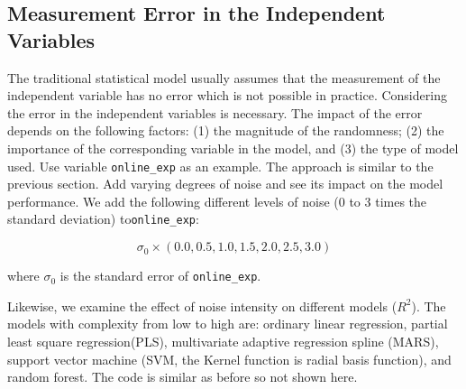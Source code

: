 \documentclass[12pt,]{krantz}
\newenvironment{Shaded}{\begin{snugshade}}{\end{snugshade}}
\newcommand{\KeywordTok}[1]{\textcolor[rgb]{0.13,0.29,0.53}{\textbf{{#1}}}}
\newcommand{\DataTypeTok}[1]{\textcolor[rgb]{0.13,0.29,0.53}{{#1}}}
\newcommand{\DecValTok}[1]{\textcolor[rgb]{0.00,0.00,0.81}{{#1}}}
\newcommand{\FloatTok}[1]{\textcolor[rgb]{0.00,0.00,0.81}{{#1}}}
\newcommand{\OtherTok}[1]{\textcolor[rgb]{0.56,0.35,0.01}{{#1}}}
\newcommand{\NormalTok}[1]{{#1}}
\theoremstyle{definition}
\theoremstyle{definition}
\theoremstyle{remark}
\begin{document}
\subsection{Measurement Error in the Independent
Variables}\label{measurement-error-in-the-independent-variables}

The traditional statistical model usually assumes that the measurement
of the independent variable has no error which is not possible in
practice. Considering the error in the independent variables is
necessary. The impact of the error depends on the following factors: (1)
the magnitude of the randomness; (2) the importance of the corresponding
variable in the model, and (3) the type of model used. Use variable
\texttt{online\_exp} as an example. The approach is similar to the
previous section. Add varying degrees of noise and see its impact on the
model performance. We add the following different levels of noise (0 to
3 times the standard deviation) to\texttt{online\_exp}:

\[\sigma_{0} \times (0.0, 0.5, 1.0, 1.5, 2.0, 2.5, 3.0)\]

where \(\sigma_{0}\) is the standard error of \texttt{online\_exp}.

\begin{Shaded}
\end{Shaded}

Likewise, we examine the effect of noise intensity on different models
(\(R^2\)). The models with complexity from low to high are: ordinary
linear regression, partial least square regression(PLS), multivariate
adaptive regression spline (MARS), support vector machine (SVM, the
Kernel function is radial basis function), and random forest. The code
is similar as before so not shown here.
\end{document}
